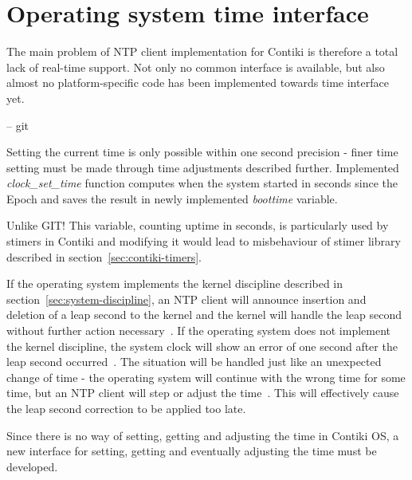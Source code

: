 
\section{Operating system time interface}
The main problem of NTP client implementation for Contiki is therefore a total
lack of real-time support.
Not only no common interface is available, but also
almost no platform-specific code has been implemented towards time interface yet.



-- git

Setting the current time is only possible within one second precision -
finer time setting must be made through time adjustments described further.
Implemented {\it{clock\_set\_time}} function computes when the system started
in seconds since the Epoch and saves the result in newly implemented {\it{boottime}} variable.



Unlike GIT!
This variable, counting uptime in seconds,
is particularly used by stimers in Contiki
and modifying it would lead to misbehaviour of stimer library
described in section~\ref{sec:contiki-timers}.


If the operating system implements the kernel discipline described in section~\ref{sec:system-discipline},
an NTP client will announce insertion and deletion of a leap second to the kernel and
the kernel will handle the leap second without further action necessary~\cite{ntp-faq}.
If the operating system does not implement the kernel discipline,
the system clock will show an error of one second after the leap second occurred~\cite{ntp-faq}.
The situation will be handled just like an unexpected change of time -
the operating system will continue with the wrong time for some time,
but an NTP client will step or adjust the time~\cite{ntp-faq}.
This will effectively cause the leap second correction to be applied too late.

Since there is no way of setting, getting and adjusting the time in Contiki OS,
a new interface for setting, getting and eventually
adjusting the time must be developed.
